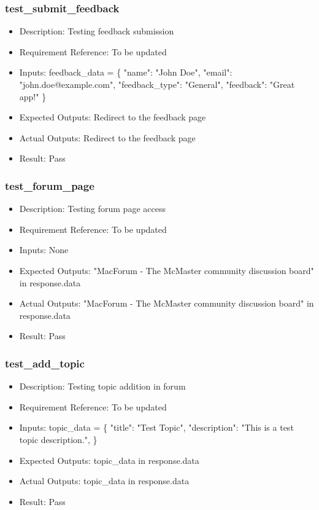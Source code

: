 \documentclass[12pt, titlepage]{article}
\begin{document}
\subsubsection{test\_submit\_feedback}\label{3.1.10}
\begin{itemize}
    \item Description: Testing feedback submission
    \item Requirement Reference: To be updated
    \item Inputs: feedback\_data = \{
        "name": "John Doe",
        "email": "john.doe@example.com",
        "feedback\_type": "General",
        "feedback": "Great app!"
    \}
    \item Expected Outputs: Redirect to the feedback page
    \item Actual Outputs: Redirect to the feedback page
    \item Result: Pass
\end{itemize}
\subsubsection{test\_forum\_page}\label{3.1.11}
\begin{itemize}
    \item Description: Testing forum page access
    \item Requirement Reference: To be updated
    \item Inputs: None
    \item Expected Outputs: "MacForum - The McMaster community discussion board" in response.data
    \item Actual Outputs: "MacForum - The McMaster community discussion board" in response.data
    \item Result: Pass
\end{itemize}
\subsubsection{test\_add\_topic}\label{3.1.12}
\begin{itemize}
    \item Description: Testing topic addition in forum 
    \item Requirement Reference: To be updated
    \item Inputs: topic\_data = \{
        "title": "Test Topic",
        "description": "This is a test topic description.",
    \}
    \item Expected Outputs: topic\_data in response.data
    \item Actual Outputs: topic\_data in response.data
    \item Result: Pass
\end{itemize}
\end{document}
